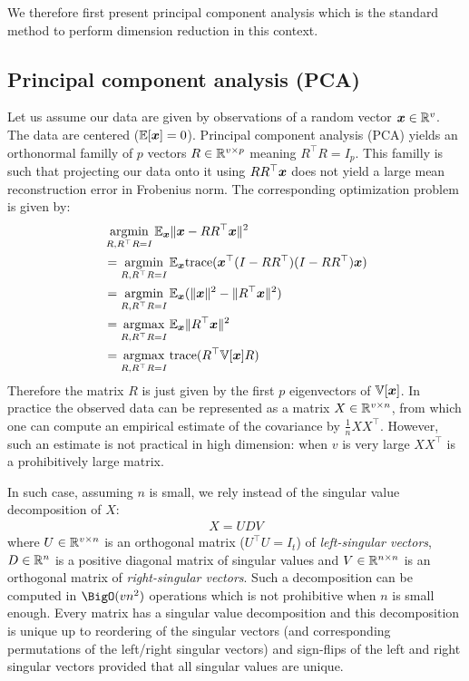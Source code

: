 We therefore first
present principal component analysis which is the standard method to perform
dimension reduction in this context.

\subsection{Principal component analysis (PCA)}
Let us assume our data are given by observations of a random vector $\boldsymbol{x} \in \mathbb{R}^{v}$. The data
are centered ($\mathbb{E}[\boldsymbol{x}] = 0$). Principal component analysis (PCA) yields an
orthonormal familly of $p$ vectors $R \in \mathbb{R}^{v \times p}$ meaning $R^{\top} R
= I_p$. This familly is such that projecting our data onto it
using $R R^{\top} \boldsymbol{x}$ does not yield a large mean reconstruction error in Frobenius
norm.
The corresponding optimization problem is given by:
\begin{align}
  &\operatorname*{argmin}_{R, R^{\top}R = I} \mathbb{E}_{\boldsymbol{x}}\|\boldsymbol{x} - R R^{\top} \boldsymbol{x} \|^2 \\
  &=\operatorname*{argmin}_{R, R^{\top}R = I} \mathbb{E}_{\boldsymbol{x}} {\mathrm{ trace}}(  \boldsymbol{x}^{\top}(I - R R^{\top}) (I - R R^{\top}) \boldsymbol{x}) \\
  &= \operatorname*{argmin}_{R, R^{\top}R = I} \mathbb{E}_{\boldsymbol{x}}(\|\boldsymbol{x} \|^2 - \|R^{\top} \boldsymbol{x} \|^2) \\
  &= \operatorname*{argmax}_{R, R^{\top}R = I} \mathbb{E}_{\boldsymbol{x}} \|R^{\top} \boldsymbol{x} \|^2 \\
  &= \operatorname*{argmax}_{R, R^{\top}R = I} {\mathrm{ trace}}(R^{\top} \mathbb{V}[\boldsymbol{x}] R)
\end{align}
Therefore the matrix $R$ is just given by the first $p$ eigenvectors of
$\mathbb{V}[\boldsymbol{x}]$. In practice the observed data can be represented as a matrix $X \in \mathbb{R}^{v \times n}$,
from which one can compute an empirical estimate of the covariance by $\frac1{n}X X^{\top}$.
%
However, such an estimate is not practical in high dimension: when $v$ is very
large $XX^{\top}$ is a prohibitively large matrix.

In such case, assuming $n$ is small, we rely instead of the singular value decomposition of $X$:
\begin{align}
X= U D V
\end{align}
  where $U \in \mathbb{R}^{v \times n}$ is an orthogonal matrix ($U^{\top} U
= I_t$) of
\emph{left-singular vectors}, $D \in \mathbb{R}^{n}$ is a positive diagonal matrix of
singular values and $V \in \mathbb{R}^{n \times n}$ is an orthogonal matrix of
\emph{right-singular vectors}. Such a decomposition can be computed in $\BigO(v
n^2)$ operations which is not prohibitive when $n$ is small enough.
%
Every matrix has a singular value decomposition and this
decomposition is unique up to reordering of the singular vectors (and
corresponding permutations of the left/right singular vectors) and sign-flips of
the left and right singular vectors provided that all singular values are unique.

